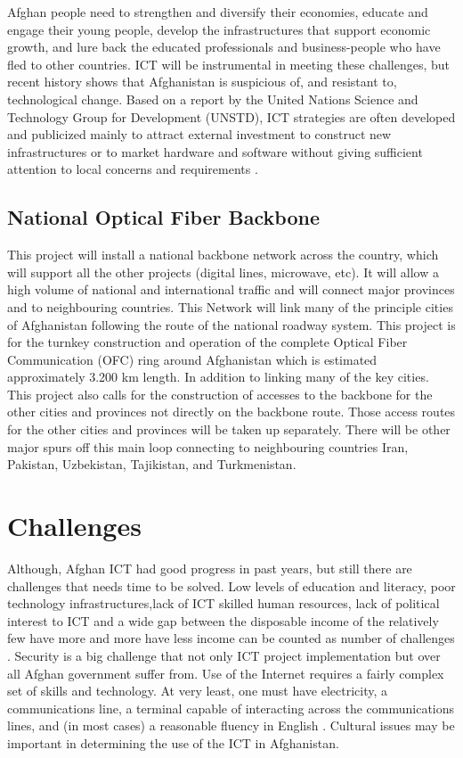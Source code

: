 Afghan people need to strengthen and diversify their economies, educate and engage their young people, develop the infrastructures that support economic growth, and lure back the educated professionals and business-people who have fled to other countries. ICT will be instrumental in meeting these challenges, but recent history shows that Afghanistan is suspicious of, and resistant to, technological change. Based on a report by the United Nations Science and Technology Group for Development (UNSTD), ICT strategies are often developed and publicized mainly to attract external investment to construct new infrastructures or to market hardware and software without giving sufficient attention to local concerns and requirements \cite{afg2}.\\


\subsection{National Optical Fiber Backbone}
This project will install a national backbone network across the country, which will support all the other projects (digital lines, microwave, etc). It will allow a high volume of national and international traffic and will connect major provinces and to neighbouring countries. This Network will link many of the principle cities of Afghanistan following the route of the national roadway system. This project is for the turnkey construction and operation of the complete Optical Fiber Communication (OFC) ring around Afghanistan which is estimated approximately 3.200 km length. In addition to linking many of the key cities. This project also calls for the construction of accesses to the backbone for the other cities and provinces not directly on the backbone route. Those access routes for the other cities and provinces will be taken up separately. There will be other major spurs off this main loop connecting to neighbouring countries Iran, Pakistan, Uzbekistan, Tajikistan, and Turkmenistan.\cite{afg1} 	

\section{Challenges}
Although, Afghan ICT had good progress in past years, but still there are challenges that needs time to be solved. Low levels of education and literacy, poor technology infrastructures,lack of ICT skilled human resources, lack of political interest to ICT and a wide gap between the disposable income of the relatively few have more and more have less income can be counted as number of challenges . Security is a big challenge that not only ICT project implementation but over all Afghan government suffer from.  Use of the Internet requires a fairly complex set of skills and technology. At very least, one must have electricity, a communications line, a terminal capable of interacting across the communications lines, and (in most cases) a reasonable fluency in English \cite{afg3}. Cultural issues may be  important in determining the use of the ICT in Afghanistan. 


